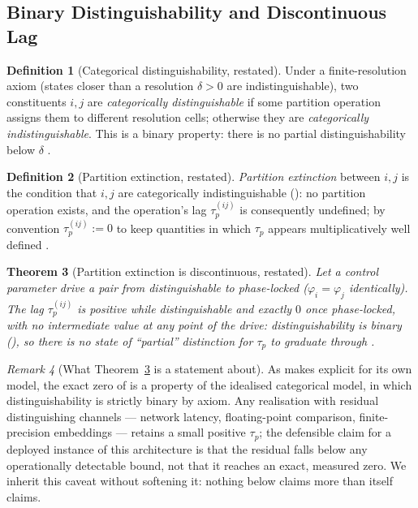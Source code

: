 \documentclass[11pt,twocolumn,a4paper]{article}
\theoremstyle{rdm}
\newtheorem{theorem}{Theorem}[section]
\theoremstyle{definition}
\newtheorem{definition}[theorem]{Definition}
\theoremstyle{remark}
\newtheorem{remark}[theorem]{Remark}
\begin{document}
\subsection{Binary Distinguishability and Discontinuous Lag}

\begin{definition}[Categorical distinguishability, restated]
\label{def:categorical-distinguishability}
Under a finite-resolution axiom (states closer than a resolution
$\delta>0$ are indistinguishable), two constituents $i,j$ are
\emph{categorically distinguishable} if some partition operation assigns
them to different resolution cells; otherwise they are \emph{categorically
indistinguishable}. This is a binary property: there is no partial
distinguishability below $\delta$
\citep[Ax.~3, Def.~14]{sachikonye-coordination-regimes}.
\end{definition}

\begin{definition}[Partition extinction, restated]
\label{def:partition-extinction}
\emph{Partition extinction} between $i,j$ is the condition that $i,j$ are
categorically indistinguishable ():
no partition operation exists, and the operation's lag $\tau_p^{(ij)}$ is
consequently undefined; by convention $\tau_p^{(ij)}:=0$ to keep quantities
in which $\tau_p$ appears multiplicatively well defined
\citep[Def.~13, 15]{sachikonye-coordination-regimes}.
\end{definition}

\begin{theorem}[Partition extinction is discontinuous, restated]
\label{thm:extinction-discontinuous}
Let a control parameter drive a pair from distinguishable to phase-locked
($\varphi_i=\varphi_j$ identically). The lag $\tau_p^{(ij)}$ is positive
while distinguishable and exactly $0$ once phase-locked, with no
intermediate value at any point of the drive: distinguishability is binary
(), so there is no state of
``partial'' distinction for $\tau_p$ to graduate through
\citep[Thm.~8]{sachikonye-coordination-regimes}.
\end{theorem}

\begin{remark}[What Theorem~\ref{thm:extinction-discontinuous} is a
statement about]
\label{rem:extinction-model-property}
As \citet[Rem.~16]{sachikonye-coordination-regimes} makes explicit for its
own model, the exact zero of  is a
property of the idealised categorical model, in which distinguishability is
strictly binary by axiom. Any realisation with residual distinguishing
channels — network latency, floating-point comparison, finite-precision
embeddings — retains a small positive $\tau_p$; the defensible claim for a
deployed instance of this architecture is that the residual falls below any
operationally detectable bound, not that it reaches an exact, measured
zero. We inherit this caveat without softening it: nothing below claims
more than \citet{sachikonye-coordination-regimes} itself claims.
\end{remark}
\end{document}
